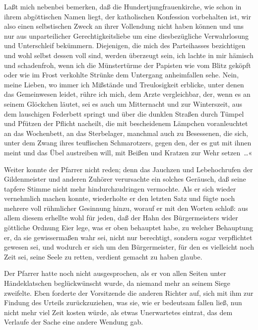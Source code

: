 Laßt mich nebenbei bemerken, daß die Hundertjungfrauenkirche, wie
\pagenum{[36]}schon in ihrem abgöttischen Namen liegt, der
katholischen Konfession vorbehalten ist, wir also einen
selbstischen Zweck an ihrer Vollendung nicht haben können und uns
nur aus unparteilicher Gerechtigkeitsliebe um eine diesbezügliche
Verwahrlosung und Unterschleif bekümmern. Diejenigen, die mich des
Parteihasses bezichtigen und wohl selbst dessen voll sind, werden
überzeugt sein, ich lachte in mir hämisch und schadenfroh, wenn ich
die Münstertürme der Papisten wie vom Blitz geköpft oder wie im
Frost verkohlte Strünke dem Untergang anheimfallen sehe. Nein,
meine Lieben, wo immer ich Mißstände und Treulosigkeit erblicke,
unter denen das Gemeinwesen leidet, rühre ich mich, dem Arzte
vergleichbar, der, wenn es an seinem Glöckchen läutet, sei es auch
um Mitternacht und zur Winterszeit, aus dem lauschigen Federbett
springt und über die dunklen Straßen durch Tümpel und Pfützen der
Pflicht nacheilt, die mit bescheidenem Lämpchen voranleuchtet an
das Wochenbett, an das Sterbelager, manchmal auch zu Besessenen,
die sich, unter dem Zwang ihres teuflischen Schmarotzers, gegen
den, der es gut mit ihnen meint und das Übel austreiben will, mit
Beißen und Kratzen zur Wehr setzen~…«

Weiter konnte der Pfarrer nicht reden; denn das Jauchzen und
Lebehochrufen der Gildenmeister und anderen Zuhörer verursachte ein
solches Geräusch, daß seine tapfere Stimme nicht mehr
hindurchzudringen vermochte. Als er sich wieder vernehmlich machen
konnte, wiederholte er den letzten Satz und fügte noch mehrere voll
rühmlicher Gesinnung hinzu, worauf er mit den Worten schloß: aus
allem diesem erhellte wohl für jeden, daß der Hahn des
Bürgermeisters wider göttliche Ordnung Eier lege, was er oben
behauptet habe, zu welcher Behauptung er, da sie gewissermaßen
\pagenum{[37]}wahr sei, nicht nur berechtigt, sondern sogar
verpflichtet gewesen sei, und wodurch er sich um den Bürgermeister,
für den es vielleicht noch Zeit sei, seine Seele zu retten,
verdient gemacht zu haben glaube.

Der Pfarrer hatte noch nicht ausgesprochen, als er von allen Seiten
unter Händeklatschen beglückwünscht wurde, da niemand mehr an
seinem Siege zweifelte. Eben forderte der Vorsitzende die anderen
Richter auf, sich mit ihm zur Findung des Urteils zurückzuziehen,
was sie, wie er bedeutsam fallen ließ, nun nicht mehr viel Zeit
kosten würde, als etwas Unerwartetes eintrat, das dem Verlaufe der
Sache eine andere Wendung gab.

